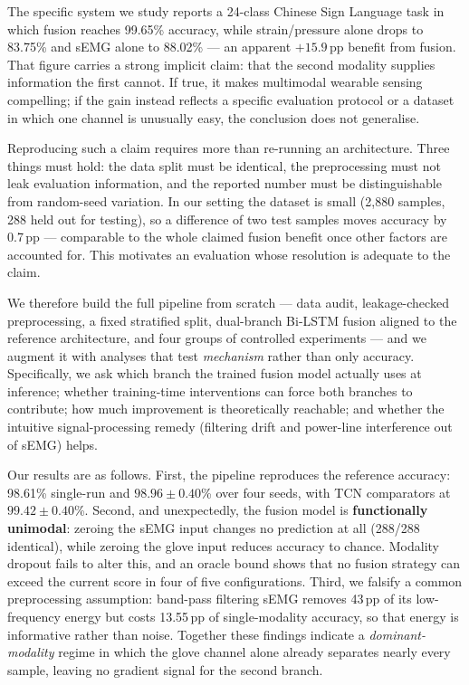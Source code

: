 \documentclass[11pt,a4paper]{article}
\begin{document}
The specific system we study reports a 24-class Chinese Sign Language task in which fusion reaches 99.65\% accuracy, while strain/pressure alone drops to 83.75\% and sEMG alone to 88.02\% --- an apparent $+15.9$\,pp benefit from fusion. That figure carries a strong implicit claim: that the second modality supplies information the first cannot. If true, it makes multimodal wearable sensing compelling; if the gain instead reflects a specific evaluation protocol or a dataset in which one channel is unusually easy, the conclusion does not generalise.

Reproducing such a claim requires more than re-running an architecture. Three things must hold: the data split must be identical, the preprocessing must not leak evaluation information, and the reported number must be distinguishable from random-seed variation. In our setting the dataset is small (2{,}880 samples, 288 held out for testing), so a difference of two test samples moves accuracy by 0.7\,pp --- comparable to the whole claimed fusion benefit once other factors are accounted for. This motivates an evaluation whose resolution is adequate to the claim.

We therefore build the full pipeline from scratch --- data audit, leakage-checked preprocessing, a fixed stratified split, dual-branch Bi-LSTM fusion aligned to the reference architecture, and four groups of controlled experiments --- and we augment it with analyses that test \emph{mechanism} rather than only accuracy. Specifically, we ask which branch the trained fusion model actually uses at inference; whether training-time interventions can force both branches to contribute; how much improvement is theoretically reachable; and whether the intuitive signal-processing remedy (filtering drift and power-line interference out of sEMG) helps.

Our results are as follows. First, the pipeline reproduces the reference accuracy: 98.61\% single-run and $98.96\pm0.40$\% over four seeds, with TCN comparators at $99.42\pm0.40$\%. Second, and unexpectedly, the fusion model is \textbf{functionally unimodal}: zeroing the sEMG input changes no prediction at all (288/288 identical), while zeroing the glove input reduces accuracy to chance. Modality dropout fails to alter this, and an oracle bound shows that no fusion strategy can exceed the current score in four of five configurations. Third, we falsify a common preprocessing assumption: band-pass filtering sEMG removes 43\,pp of its low-frequency energy but costs 13.55\,pp of single-modality accuracy, so that energy is informative rather than noise. Together these findings indicate a \emph{dominant-modality} regime in which the glove channel alone already separates nearly every sample, leaving no gradient signal for the second branch.
\end{document}
